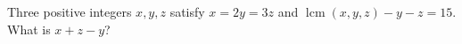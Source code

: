 Three positive integers $x,y,z$ satisfy $x=2y=3z$ and $\operatorname{lcm}(x,y,z)-y-z=15$. What is $x+z-y$?
